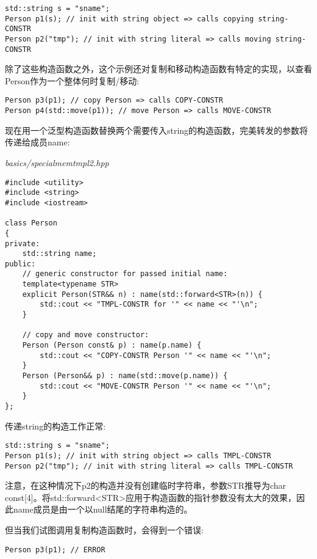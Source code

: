 \begin{lstlisting}[style=styleCXX]
std::string s = "sname";
Person p1(s); // init with string object => calls copying string-CONSTR
Person p2("tmp"); // init with string literal => calls moving string-CONSTR
\end{lstlisting}

除了这些构造函数之外，这个示例还对复制和移动构造函数有特定的实现，以查看Person作为一个整体何时复制/移动:

\begin{lstlisting}[style=styleCXX]
Person p3(p1); // copy Person => calls COPY-CONSTR
Person p4(std::move(p1)); // move Person => calls MOVE-CONSTR
\end{lstlisting}

现在用一个泛型构造函数替换两个需要传入string的构造函数，完美转发的参数将传递给成员name:

\noindent
\textit{basics/specialmemtmpl2.hpp}
\begin{lstlisting}[style=styleCXX]
#include <utility>
#include <string>
#include <iostream>

class Person
{
private:
	std::string name;
public:
	// generic constructor for passed initial name:
	template<typename STR>
	explicit Person(STR&& n) : name(std::forward<STR>(n)) {
		std::cout << "TMPL-CONSTR for '" << name << "'\n";
	}

	// copy and move constructor:
	Person (Person const& p) : name(p.name) {
		std::cout << "COPY-CONSTR Person '" << name << "'\n";
	}
	Person (Person&& p) : name(std::move(p.name)) {
		std::cout << "MOVE-CONSTR Person '" << name << "'\n";
	}
};
\end{lstlisting}

传递string的构造工作正常:

\begin{lstlisting}[style=styleCXX]
std::string s = "sname";
Person p1(s); // init with string object => calls TMPL-CONSTR
Person p2("tmp"); // init with string literal => calls TMPL-CONSTR
\end{lstlisting}

注意，在这种情况下p2的构造并没有创建临时字符串，参数STR推导为char const[4]。将std::forward<STR>应用于构造函数的指针参数没有太大的效果，因此name成员是由一个以null结尾的字符串构造的。

但当我们试图调用复制构造函数时，会得到一个错误:

\begin{lstlisting}[style=styleCXX]
Person p3(p1); // ERROR
\end{lstlisting}

